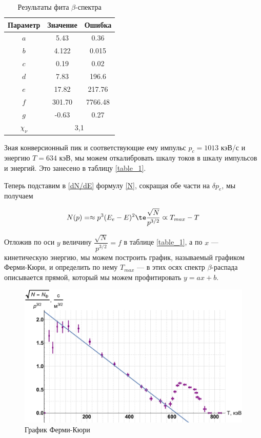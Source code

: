 \documentclass[12pt]{kiarticle}
\newcommand{\be}{\ensuremath{\beta}}
\begin{document}
\begin{table}[H]
	\caption{Результаты фита \be-спектра}
	\label{fit}
	\begin{center}
	\begin{tabular}{|c|c|c|}
		\hline
		Параметр & Значение & Ошибка \\
	\hline 
$ a $&5.43 & 0.36 \\
$ b $&4.122 & 0.015 \\
$ c $&0.19 & 0.02\\
$ d $&7.83 & 196.6 \\
$ e $&17.82 & 217.76 \\
$ f $&301.70 & 7766.48 \\
$ g $&-0.63 & 0.27 \\
\hline
$ \chi_\nu $ & \multicolumn{2}{|c|}{3,1}  \\
\hline
\end{tabular}
\end{center} 
\end{table}

Зная конверсионный пик и соответствующие ему импульс $ p_c = 1013 $ кэВ/$ с $ и энергию $ T = 634 $ кэВ, мы можем откалибровать шкалу токов в шкалу импульсов и энергий. Это занесено в таблицу \ref{table_1}.

Теперь подставим в \eqref{dN/dE} формулу \eqref{N}, сокращая обе части на $ \delta  p_e $, мы получаем 

\begin{equation}\label{}
N(p) = \approx p^3 (E_e - E)^2 \te \dfrac{\sqrt{N}}{p^{3/2}} \varpropto T_{max} - T
\end{equation}

Отложив по оси $ y $ величину $ \dfrac{\sqrt{N}}{p^{3/2}} = f $ в таблице \ref{table_1}, а по $ x $ --- кинетическую энергию, мы можем построить график, называемый графиком Ферми-Кюри, и определить по нему $ T_{max} $ --- в этих осях спектр \be-распада описывается прямой, который мы можем профитировать $ y = ax +b $.

	\begin{figure}[H]
	\label{graf_kk}
	\includegraphics[scale=0.47]{kk.pdf}
	\caption{График Ферми-Кюри}
\end{figure}
\end{document}
